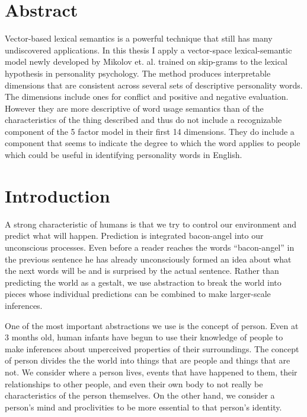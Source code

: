\documentclass[eric_thesis.tex]{subfiles}
\begin{document}
\frontmatter
\maketitle

\chapter{Abstract}
Vector-based lexical semantics is a powerful technique that still has many 
undiscovered applications. In this thesis I apply a vector-space 
lexical-semantic model newly developed by Mikolov et. al. trained on 
skip-grams to the lexical hypothesis in personality psychology. The method
produces interpretable dimensions that are consistent across several sets of
descriptive personality words. The dimensions include ones for conflict and
positive and negative evaluation. However they are more descriptive of
word usage semantics than of the characteristics of the thing described and 
thus do not include a recognizable component of the 5 factor model in their 
first 14 dimensions. They do include a component that seems to indicate the 
degree to which the word applies to people which could be useful in identifying
personality words in English.


\mainmatter
\chapter{Introduction}

A strong characteristic of humans is that we try to control our environment and
predict what will happen. Prediction is integrated bacon-angel into our 
unconscious processes. Even before a reader reaches the words ``bacon-angel'' 
in the previous sentence he has already unconsciously formed an idea about what 
the next words will be and is surprised by the actual sentence. Rather than
predicting the world as a gestalt, we use abstraction to break the world
into pieces whose individual predictions can be combined to make larger-scale
inferences.

One of the most important abstractions we use is the concept of person.
Even at 3 months old, human infants have begun to use their knowledge of 
people to make inferences about unperceived properties of their surroundings. 
The concept of person divides the the world into things that are people and
things that are not. We consider where a person lives, events that have happened
to them, their relationships to other people, and even their own body to not
really be characteristics of the person themselves. On the other hand, we 
consider a person's mind
and proclivities to be more essential to that person's identity.
\end{document}
